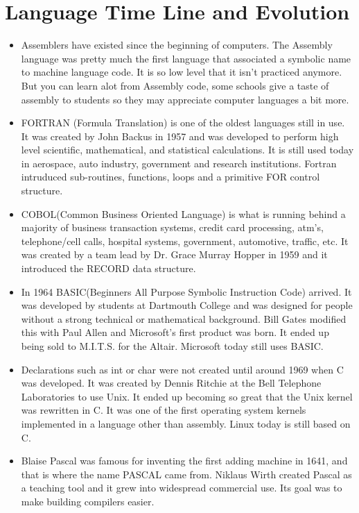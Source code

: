 \documentclass[letterpaper, 10 pt, conference]{IEEEtran}
\begin{document}
\section{Language Time Line and Evolution}
\begin{itemize}
\item Assemblers have existed since the beginning of computers. The Assembly language was pretty much the first language that associated a symbolic name to machine language code. It is so low level that it isn't practiced anymore. But you can learn alot from Assembly code, some schools give a taste of assembly to students so they may appreciate computer languages a bit more. \bigskip \item FORTRAN (Formula Translation) is one of the oldest languages still in use. It was created by John Backus in 1957 and was developed to perform high level scientific, mathematical, and statistical calculations. It is still used today in aerospace, auto industry, government and research institutions. Fortran intruduced sub-routines, functions, loops and a primitive FOR control structure. \bigskip
\item COBOL(Common Business Oriented Language) is what is running behind a majority of business transaction systems, credit card processing, atm's, telephone/cell calls, hospital systems, government, automotive, traffic, etc. It was created by a team lead by Dr. Grace Murray Hopper in 1959 and it introduced the RECORD data structure.\bigskip
\item In 1964 BASIC(Beginners All Purpose Symbolic Instruction Code) arrived. It was developed by students at Dartmouth College and was designed for people without a strong technical or mathematical background. Bill Gates modified this with Paul Allen and Microsoft's first product was born. It ended up being sold to M.I.T.S. for the Altair. Microsoft today still uses BASIC. \bigskip \item Declarations such as int or char were not created until around 1969 when C was developed. It was created by Dennis Ritchie at the Bell Telephone Laboratories to use Unix. It ended up becoming so great that the Unix kernel was rewritten in C. It was one of the first operating system kernels implemented in a language other than assembly. Linux today is still based on C. \bigskip \item Blaise Pascal was famous for inventing the first adding machine in 1641, and that is where the name PASCAL came from. Niklaus Wirth created Pascal as a teaching tool and it grew into widespread commercial use. Its goal was to make building compilers easier. \bigskip

\end{itemize}
\end{document}
